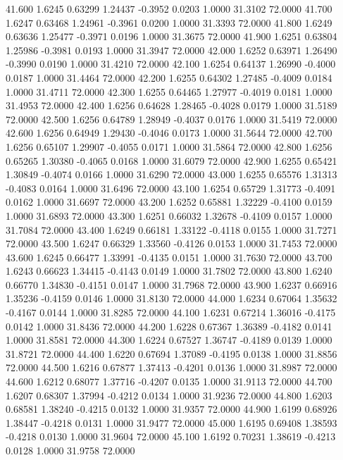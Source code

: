  41.600   1.6245   0.63299   1.24437  -0.3952   0.0203   1.0000  31.3102  72.0000
  41.700   1.6247   0.63468   1.24961  -0.3961   0.0200   1.0000  31.3393  72.0000
  41.800   1.6249   0.63636   1.25477  -0.3971   0.0196   1.0000  31.3675  72.0000
  41.900   1.6251   0.63804   1.25986  -0.3981   0.0193   1.0000  31.3947  72.0000
  42.000   1.6252   0.63971   1.26490  -0.3990   0.0190   1.0000  31.4210  72.0000
  42.100   1.6254   0.64137   1.26990  -0.4000   0.0187   1.0000  31.4464  72.0000
  42.200   1.6255   0.64302   1.27485  -0.4009   0.0184   1.0000  31.4711  72.0000
  42.300   1.6255   0.64465   1.27977  -0.4019   0.0181   1.0000  31.4953  72.0000
  42.400   1.6256   0.64628   1.28465  -0.4028   0.0179   1.0000  31.5189  72.0000
  42.500   1.6256   0.64789   1.28949  -0.4037   0.0176   1.0000  31.5419  72.0000
  42.600   1.6256   0.64949   1.29430  -0.4046   0.0173   1.0000  31.5644  72.0000
  42.700   1.6256   0.65107   1.29907  -0.4055   0.0171   1.0000  31.5864  72.0000
  42.800   1.6256   0.65265   1.30380  -0.4065   0.0168   1.0000  31.6079  72.0000
  42.900   1.6255   0.65421   1.30849  -0.4074   0.0166   1.0000  31.6290  72.0000
  43.000   1.6255   0.65576   1.31313  -0.4083   0.0164   1.0000  31.6496  72.0000
  43.100   1.6254   0.65729   1.31773  -0.4091   0.0162   1.0000  31.6697  72.0000
  43.200   1.6252   0.65881   1.32229  -0.4100   0.0159   1.0000  31.6893  72.0000
  43.300   1.6251   0.66032   1.32678  -0.4109   0.0157   1.0000  31.7084  72.0000
  43.400   1.6249   0.66181   1.33122  -0.4118   0.0155   1.0000  31.7271  72.0000
  43.500   1.6247   0.66329   1.33560  -0.4126   0.0153   1.0000  31.7453  72.0000
  43.600   1.6245   0.66477   1.33991  -0.4135   0.0151   1.0000  31.7630  72.0000
  43.700   1.6243   0.66623   1.34415  -0.4143   0.0149   1.0000  31.7802  72.0000
  43.800   1.6240   0.66770   1.34830  -0.4151   0.0147   1.0000  31.7968  72.0000
  43.900   1.6237   0.66916   1.35236  -0.4159   0.0146   1.0000  31.8130  72.0000
  44.000   1.6234   0.67064   1.35632  -0.4167   0.0144   1.0000  31.8285  72.0000
  44.100   1.6231   0.67214   1.36016  -0.4175   0.0142   1.0000  31.8436  72.0000
  44.200   1.6228   0.67367   1.36389  -0.4182   0.0141   1.0000  31.8581  72.0000
  44.300   1.6224   0.67527   1.36747  -0.4189   0.0139   1.0000  31.8721  72.0000
  44.400   1.6220   0.67694   1.37089  -0.4195   0.0138   1.0000  31.8856  72.0000
  44.500   1.6216   0.67877   1.37413  -0.4201   0.0136   1.0000  31.8987  72.0000
  44.600   1.6212   0.68077   1.37716  -0.4207   0.0135   1.0000  31.9113  72.0000
  44.700   1.6207   0.68307   1.37994  -0.4212   0.0134   1.0000  31.9236  72.0000
  44.800   1.6203   0.68581   1.38240  -0.4215   0.0132   1.0000  31.9357  72.0000
  44.900   1.6199   0.68926   1.38447  -0.4218   0.0131   1.0000  31.9477  72.0000
  45.000   1.6195   0.69408   1.38593  -0.4218   0.0130   1.0000  31.9604  72.0000
  45.100   1.6192   0.70231   1.38619  -0.4213   0.0128   1.0000  31.9758  72.0000
